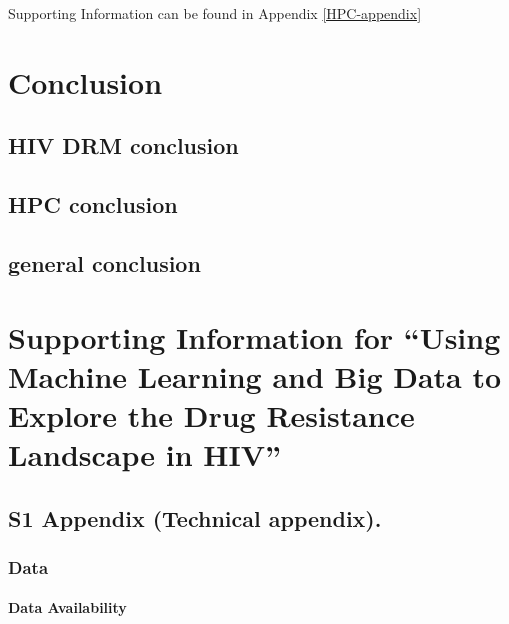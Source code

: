 \documentclass[
  11,
]{scrbook}
\begin{document}
Supporting Information can be found in Appendix \ref{HPC-appendix}

\printbibliography[segment=\therefsegment,heading=subbibintoc,title={References for chapter \thechapter}]

\hypertarget{conclusion}{%
\chapter{Conclusion}\label{conclusion}}

\hypertarget{hiv-drm-conclusion}{%
\section{HIV DRM conclusion}\label{hiv-drm-conclusion}}

\hypertarget{hpc-conclusion}{%
\section{HPC conclusion}\label{hpc-conclusion}}

\hypertarget{general-conclusion}{%
\section{general conclusion}\label{general-conclusion}}

\appendix


\hypertarget{HIV-appendix}{%
\chapter{Supporting Information for ``Using Machine Learning and Big Data to Explore the Drug Resistance Landscape in HIV''}\label{HIV-appendix}}

\hypertarget{S1-Appendix}{%
\section{S1 Appendix (Technical appendix).}\label{S1-Appendix}}

\hypertarget{data-appendix}{%
\subsection{Data}\label{data-appendix}}

\hypertarget{data-availability}{%
\subsubsection{Data Availability}\label{data-availability}}
\end{document}

